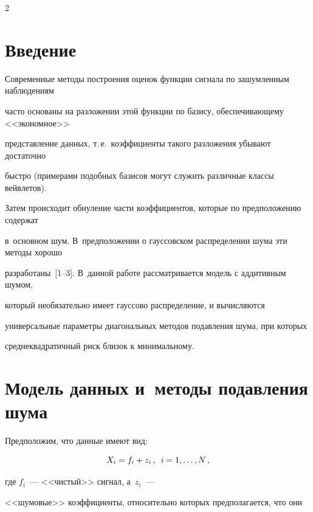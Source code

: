 \begin{multicols}{2}



\label{st\stat}



\section{Введение}



Современные методы построения оценок функции сигнала по зашумленным наблюдениям 

часто основаны на разложении этой функции по базису, обеспечивающему <<экономное>> 

представление данных, т.\,е.\ коэффициенты такого разложения убывают достаточно 

быстро (примерами подобных базисов могут служить различные классы вейвлетов). 

Затем происходит обнуление части коэффициентов, которые по предположению содержат 

в~основном шум. В~предположении о гауссовском распределении шума эти методы хорошо 

разработаны~[1--3]. В~данной работе рассматривается модель с аддитивным шумом, 

который необязательно имеет гауссово распределение, и вычисляются 

универсальные параметры диагональных методов подавления шума, при которых 

среднеквадратичный риск близок к минимальному.



\section{Модель данных и~методы подавления шума}



Предположим, что данные имеют вид:

\begin{equation*}


X_i=f_i+z_i\,, \enskip i=1,\ldots,N\,,

\end{equation*}

где $f_i$~--- <<чистый>> сигнал, а~$z_i$~--- 

<<шумовые>> коэффициенты, относительно которых предполагается, что они 


\end{multicols}

